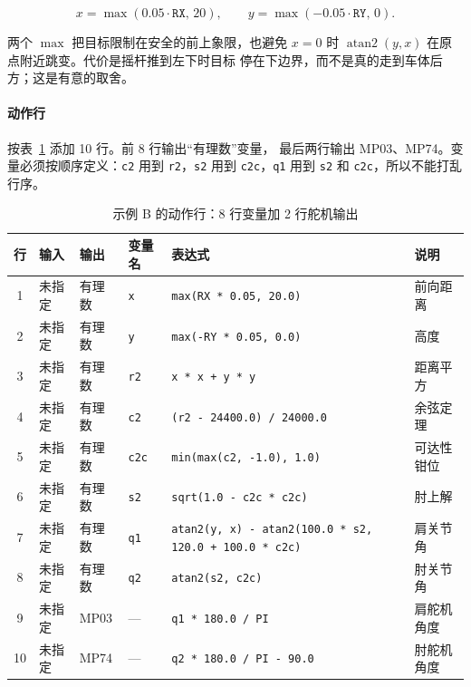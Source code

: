 \begin{equation}
x=\max(0.05\cdot\texttt{RX},\,20),\qquad
y=\max(-0.05\cdot\texttt{RY},\,0).
\label{eq:ch05-arm-input}
\end{equation}

两个 $\max$ 把目标限制在安全的前上象限，也避免 $x=0$ 时
$\operatorname{atan2}(y,x)$ 在原点附近跳变。代价是摇杆推到左下时目标
停在下边界，而不是真的走到车体后方；这是有意的取舍。

\paragraph*{动作行}
按表~\ref{tab:ch05-arm-rows} 添加 10 行。前 8 行输出“有理数”变量，
最后两行输出 MP03、MP74。变量必须按顺序定义：\texttt{c2} 用到
\texttt{r2}，\texttt{s2} 用到 \texttt{c2c}，\texttt{q1} 用到
\texttt{s2} 和 \texttt{c2c}，所以不能打乱行序。

\begin{table}[htbp]
  \centering
  \small
  \setlength{\tabcolsep}{4pt}
  \begin{tabularx}{\linewidth}{@{}c l l l >{\raggedright\arraybackslash}X l@{}}
    \toprule
    行 & 输入 & 输出 & 变量名 & 表达式 & 说明 \\
    \midrule
    1 & 未指定 & 有理数 & \texttt{x} & \texttt{max(RX * 0.05, 20.0)} & 前向距离 \\
    2 & 未指定 & 有理数 & \texttt{y} & \texttt{max(-RY * 0.05, 0.0)} & 高度 \\
    3 & 未指定 & 有理数 & \texttt{r2} & \texttt{x * x + y * y} & 距离平方 \\
    4 & 未指定 & 有理数 & \texttt{c2} & \texttt{(r2 - 24400.0) / 24000.0} & 余弦定理 \\
    5 & 未指定 & 有理数 & \texttt{c2c} & \texttt{min(max(c2, -1.0), 1.0)} & 可达性钳位 \\
    6 & 未指定 & 有理数 & \texttt{s2} & \texttt{sqrt(1.0 - c2c * c2c)} & 肘上解 \\
    7 & 未指定 & 有理数 & \texttt{q1} & \texttt{atan2(y, x) - atan2(100.0 * s2, 120.0 + 100.0 * c2c)} & 肩关节角 \\
    8 & 未指定 & 有理数 & \texttt{q2} & \texttt{atan2(s2, c2c)} & 肘关节角 \\
    9 & 未指定 & MP03 & — & \texttt{q1 * 180.0 / PI} & 肩舵机角度 \\
    10 & 未指定 & MP74 & — & \texttt{q2 * 180.0 / PI - 90.0} & 肘舵机角度 \\
    \bottomrule
  \end{tabularx}
  \caption{示例 B 的动作行：8 行变量加 2 行舵机输出}
  \label{tab:ch05-arm-rows}
\end{table}

